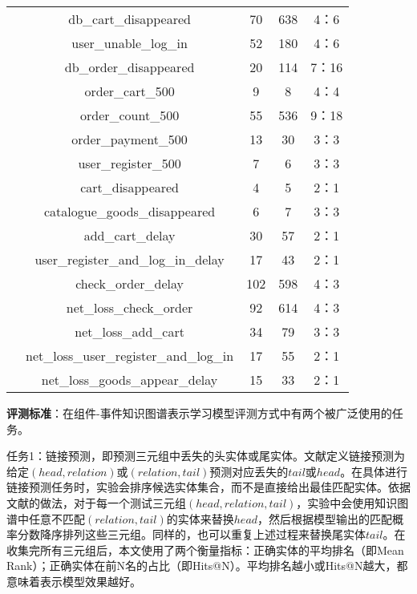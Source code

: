 \begin{table}[htbp]
\begin{tabular}{ccccc}
                 & db\_cart\_disappeared                      & 70      & 638     & 4：6     \\
                 & user\_unable\_log\_in                        & 52      & 180     & 4：6     \\
                 & db\_order\_disappeared                   & 20      & 114     & 7：16    \\
                 & order\_cart\_500                                          & 9       & 8       & 4：4     \\
                 & order\_count\_500                                         & 55      & 536     & 9：18    \\
                 & order\_payment\_500                                       & 13      & 30      & 3：3     \\
                 & user\_register\_500                                 & 7       & 6       & 3：3     \\
                 & cart\_disappeared                             & 4       & 5       & 2：1     \\
                 & catalogue\_goods\_disappeared              & 6       & 7       & 3：3     \\
                 & add\_cart\_delay              & 30      & 57      & 2：1     \\
                 & user\_register\_and\_log\_in\_delay & 17      & 43      & 2：1     \\
                 & check\_order\_delay         & 102     & 598     & 4：3     \\
                 & net\_loss\_check\_order          & 92      & 614     & 4：3     \\
                 & net\_loss\_add\_cart               & 34      & 79      & 3：3     \\
                 & net\_loss\_user\_register\_and\_log\_in  & 17      & 55      & 2：1     \\
                 & net\_loss\_goods\_appear\_delay & 15      & 33      & 2：1     \\ \hline
    \end{tabular}
    \end{table}


\textbf{评测标准}：在组件-事件知识图谱表示学习模型评测方式中有两个被广泛使用的任务。

任务1：链接预测，即预测三元组中丢失的头实体或尾实体。文献\parencite{bordes2011learning,bordes2013translating}定义链接预测为给定$(head,relation)$或$(relation,tail)$预测对应丢失的$tail$或$head$。在具体进行链接预测任务时，实验会排序候选实体集合，而不是直接给出最佳匹配实体。依据文献\parencite{bordes2013translating}的做法，对于每一个测试三元组$(head,relation,tail)$，实验中会使用知识图谱中任意不匹配$(relation,tail)$的实体来替换$head$，然后根据模型输出的匹配概率分数降序排列这些三元组。同样的，也可以重复上述过程来替换尾实体$tail$。在收集完所有三元组后，本文使用了两个衡量指标：正确实体的平均排名（即Mean Rank）；正确实体在前N名的占比（即Hits@N）。平均排名越小或Hits@N越大，都意味着表示模型效果越好。

